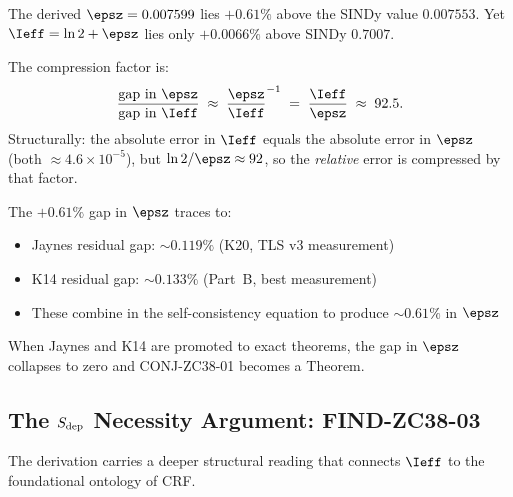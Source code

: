 \documentclass[12pt, a4paper]{article}
\begin{document}
\begin{formalbox}[title={OBS-ZC38-01: Why the $\Ieff$ Gap Is Much Smaller Than the $\epsz$ Gap}]
The derived $\epsz = 0.007599$ lies $+0.61\%$ above the SINDy value $0.007553$.
Yet $\Ieff = \ln 2 + \epsz$ lies only $+0.0066\%$ above SINDy $0.7007$.

The compression factor is:
\[
  \frac{\text{gap in }\epsz}{\text{gap in }\Ieff}
  \;\approx\; \frac{\epsz}{\Ieff}^{-1}
  \;=\; \frac{\Ieff}{\epsz} \;\approx\; 92.5.
\]
Structurally: the absolute error in $\Ieff$ equals the absolute error
in $\epsz$ (both $\approx 4.6 \times 10^{-5}$), but $\ln 2 / \epsz \approx 92$,
so the \emph{relative} error is compressed by that factor.

\medskip
The $+0.61\%$ gap in $\epsz$ traces to:
\begin{itemize}[noitemsep,leftmargin=2em]
  \item Jaynes residual gap: $\sim 0.119\%$ (K20, TLS v3 measurement)
  \item K14 residual gap: $\sim 0.133\%$ (Part~B, best measurement)
  \item These combine in the self-consistency equation to produce $\sim 0.61\%$ in $\epsz$
\end{itemize}
When Jaynes and K14 are promoted to exact theorems, the gap
in $\epsz$ collapses to zero and CONJ-ZC38-01 becomes a Theorem.
\end{formalbox}

\subsection{The $S_{\rm dep}$ Necessity Argument: FIND-ZC38-03}
\label{sec:sdep}

The derivation carries a deeper structural reading that connects
$\Ieff$ to the foundational ontology of CRF.
\end{document}
